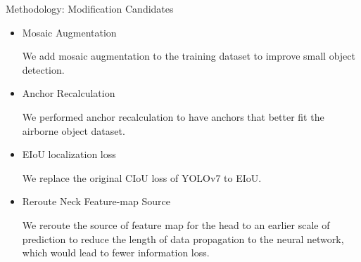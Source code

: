 \documentclass[final,hyperref={pdfpagelabels=false}]{beamer}
\begin{document}
\begin{frame}[t]
\begin{columns}[t]
\begin{column}{.465\textwidth}

\begin{block}{Methodology: Modification Candidates}
\begin{itemize}
  \item {Mosaic Augmentation}

  We add mosaic augmentation to the training dataset to improve small object detection.
  
  \item {Anchor Recalculation}

  We performed anchor recalculation to have anchors that better fit the airborne object dataset.
  
  \item {EIoU localization loss}

  We replace the original CIoU loss of YOLOv7 to EIoU.

  
  \item {Reroute Neck Feature-map Source}

  We reroute the source of feature map for the head to an earlier scale of prediction to reduce the length of data propagation to the neural network, which would lead to fewer information loss.


\end{itemize}
\end{block}
\end{column}
\end{columns}
\end{frame}
\end{document}
